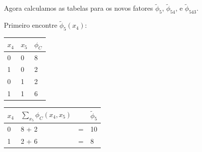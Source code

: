 \begin{exenumerate}
\begin{solution}
\begin{center}
        \end{center}
        
        Agora calculamos as tabelas para os novos fatores $\tilde{\phi}_5$, $\tilde{\phi}_{54}$, e $\tilde{\phi}_{543}$.
        
        Primeiro encontre $\tilde{\phi}_5(x_4)$:
        \begin{center}
            \begin{tabular}{lll}
                \toprule
                $x_4$ & $x_5$ & $\phi_C$\\
                \midrule
                0 & 0 & 8 \\
                1 & 0 & 2 \\
                0 & 1 & 2 \\
                1 & 1 & 6 \\
                \bottomrule
            \end{tabular}
            \hspace{3ex}  \hspace{3ex}
            \begin{tabular}{llll}
                \toprule
                $x_4$ & $\sum_{x_5} \phi_C(x_4, x_5)$ &  & $\tilde{\phi}_5$\\
                \midrule
                0 & 8 + 2 & = & 10 \\
                1 & 2 + 6 & = & 8 \\
                \bottomrule
            \end{tabular}
        \end{center}
        

\end{solution}
\end{exenumerate}
